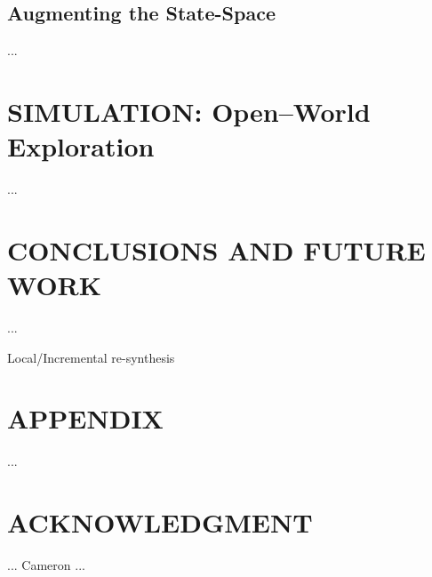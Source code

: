\documentclass[letterpaper, 10 pt, conference]{ieeeconf}  %
\begin{document}
\subsection{Augmenting the State-Space} %

...


\section{SIMULATION: Open--World Exploration}  %

...


\section{CONCLUSIONS AND FUTURE WORK}

...

Local/Incremental re-synthesis



\section*{APPENDIX}

...

\section*{ACKNOWLEDGMENT}

... Cameron ...




\end{document}
